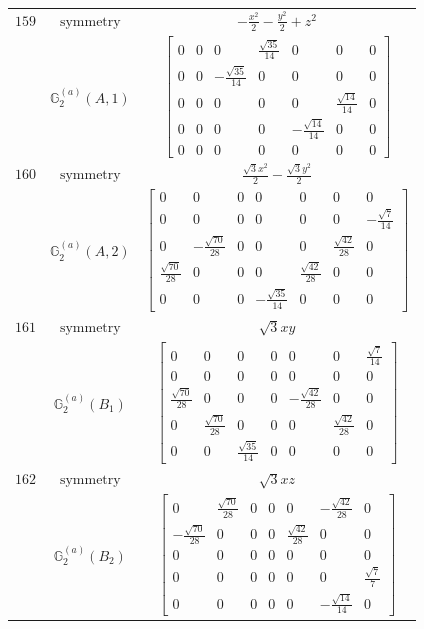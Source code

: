 \documentclass[fleqn,8pt,landscape]{jsarticle}
\begin{document}
\begin{longtable}{ccc}
$ 159 $ & $ \text{symmetry} $ & $ - \frac{x^{2}}{2} - \frac{y^{2}}{2} + z^{2} $ \\
$  $ & $ \mathbb{G}_{2}^{(a)}(A,1) $ & $ \begin{bmatrix} 0 & 0 & 0 & \frac{\sqrt{35}}{14} & 0 & 0 & 0 \\ 0 & 0 & - \frac{\sqrt{35}}{14} & 0 & 0 & 0 & 0 \\ 0 & 0 & 0 & 0 & 0 & \frac{\sqrt{14}}{14} & 0 \\ 0 & 0 & 0 & 0 & - \frac{\sqrt{14}}{14} & 0 & 0 \\ 0 & 0 & 0 & 0 & 0 & 0 & 0 \end{bmatrix} $ \\ \hline
$ 160 $ & $ \text{symmetry} $ & $ \frac{\sqrt{3} x^{2}}{2} - \frac{\sqrt{3} y^{2}}{2} $ \\
$  $ & $ \mathbb{G}_{2}^{(a)}(A,2) $ & $ \begin{bmatrix} 0 & 0 & 0 & 0 & 0 & 0 & 0 \\ 0 & 0 & 0 & 0 & 0 & 0 & - \frac{\sqrt{7}}{14} \\ 0 & - \frac{\sqrt{70}}{28} & 0 & 0 & 0 & \frac{\sqrt{42}}{28} & 0 \\ \frac{\sqrt{70}}{28} & 0 & 0 & 0 & \frac{\sqrt{42}}{28} & 0 & 0 \\ 0 & 0 & 0 & - \frac{\sqrt{35}}{14} & 0 & 0 & 0 \end{bmatrix} $ \\ \hline
$ 161 $ & $ \text{symmetry} $ & $ \sqrt{3} x y $ \\
$  $ & $ \mathbb{G}_{2}^{(a)}(B_{1}) $ & $ \begin{bmatrix} 0 & 0 & 0 & 0 & 0 & 0 & \frac{\sqrt{7}}{14} \\ 0 & 0 & 0 & 0 & 0 & 0 & 0 \\ \frac{\sqrt{70}}{28} & 0 & 0 & 0 & - \frac{\sqrt{42}}{28} & 0 & 0 \\ 0 & \frac{\sqrt{70}}{28} & 0 & 0 & 0 & \frac{\sqrt{42}}{28} & 0 \\ 0 & 0 & \frac{\sqrt{35}}{14} & 0 & 0 & 0 & 0 \end{bmatrix} $ \\ \hline
$ 162 $ & $ \text{symmetry} $ & $ \sqrt{3} x z $ \\
$  $ & $ \mathbb{G}_{2}^{(a)}(B_{2}) $ & $ \begin{bmatrix} 0 & \frac{\sqrt{70}}{28} & 0 & 0 & 0 & - \frac{\sqrt{42}}{28} & 0 \\ - \frac{\sqrt{70}}{28} & 0 & 0 & 0 & \frac{\sqrt{42}}{28} & 0 & 0 \\ 0 & 0 & 0 & 0 & 0 & 0 & 0 \\ 0 & 0 & 0 & 0 & 0 & 0 & \frac{\sqrt{7}}{7} \\ 0 & 0 & 0 & 0 & 0 & - \frac{\sqrt{14}}{14} & 0 \end{bmatrix} $ \\ \hline

\end{longtable}
\end{document}
